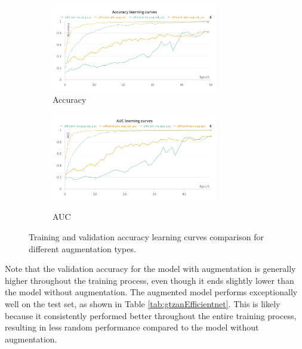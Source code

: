 \begin{figure}[!htb]
    \centering
    \begin{subfigure}{\textwidth}
        \centering
        \includegraphics[width=0.8\textwidth]{Images/gtzan_plots/lc/efficient_acc_lc.png}
        \caption{Accuracy}
    \end{subfigure}
    \vspace{0.3cm}
    \hfill
    \begin{subfigure}{\textwidth}
        \centering
        \includegraphics[width=0.8\textwidth]{Images/gtzan_plots/lc/efficient_auc_lc.png}\
        \caption{AUC}
    \end{subfigure}
    \vspace{0.3cm}
    \caption{Training and validation accuracy learning curves comparison for different augmentation types.}
    \label{fig:gtzanEfficientLC}
\end{figure}

Note that the validation accuracy for the model with augmentation is generally higher throughout the training process, even though it ends slightly lower than the model without augmentation. The augmented model performs exceptionally well on the test set, as shown in Table \ref{tab:gtzanEfficientnet}. This is likely because it consistently performed better throughout the entire training process, resulting in less random performance compared to the model without augmentation.

